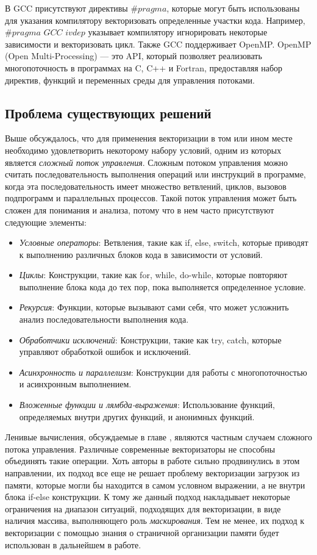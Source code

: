 В GCC присутствуют директивы $\#pragma$, которые могут быть использованы для указания компилятору векторизовать определенные участки кода. Например, $\#pragma$ $GCC$ $ivdep$ указывает компилятору игнорировать некоторые зависимости и векторизовать цикл. Также GCC поддерживает OpenMP. OpenMP (Open Multi-Processing) — это API, который позволяет реализовать многопоточность в программах на C, C++ и Fortran, предоставляя набор директив, функций и переменных среды для управления потоками.


\subsection{Проблема существующих решений}
Выше обсуждалось, что для применения векторизации в том или ином месте необходимо удовлетворить некоторому набору условий, одним из которых является \textit{сложный поток управления}. Сложным потоком управления можно считать последовательность выполнения операций или инструкций в программе, когда эта последовательность имеет множество ветвлений, циклов, вызовов подпрограмм и параллельных процессов. Такой поток управления может быть сложен для понимания и анализа, потому что в нем часто присутствуют следующие элементы:

\begin{itemize}
    \item \textit{Условные операторы}: Ветвления, такие как if, else, switch, которые приводят к выполнению различных блоков кода в зависимости от условий.
    \item \textit{Циклы}: Конструкции, такие как for, while, do-while, которые повторяют выполнение блока кода до тех пор, пока выполняется определенное условие.
    \item \textit{Рекурсия}: Функции, которые вызывают сами себя, что может усложнить анализ последовательности выполнения кода.
    \item \textit{Обработчики исключений}: Конструкции, такие как try, catch, которые управляют обработкой ошибок и исключений.
    \item \textit{Асинхронность и параллелизм}: Конструкции для работы с многопоточностью и асинхронным выполнением.
    \item \textit{Вложенные функции и лямбда-выражения}: Использование функций, определяемых внутри других функций, и анонимных функций.
\end{itemize}

Ленивые вычисления, обсуждаемые в главе \todo[глава], являются частным случаем сложного потока управления. Различные современные векторизаторы не способны объединять такие операции. Хоть авторы в работе \todo[работа] сильно продвинулись в этом направлении, их подход все еще не решает проблему векторизации загрузок из памяти, которые могли бы находится в самом условном выражении, а не внутри блока if-else конструкции. К тому же данный подход накладывает некоторые ограничения на диапазон ситуаций, подходящих для векторизации, в виде наличия массива, выполняющего роль \textit{маскирования}. Тем не менее, их подход к векторизации с помощью знания о страничной организации памяти будет использован в дальнейшем в работе.

